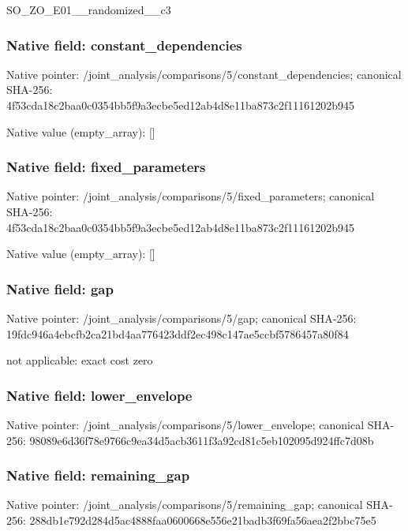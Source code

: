 \documentclass[10pt,a4paper]{article}
\begin{document}
\begingroup\raggedright\sloppy SO\_\allowbreak{}ZO\_\allowbreak{}E01\_\allowbreak{}\_\allowbreak{}randomized\_\allowbreak{}\_\allowbreak{}c3\par\endgroup

\subsubsection{Native field: constant\_\allowbreak{}dependencies}
Native pointer: /joint\_\allowbreak{}analysis/comparisons/5/constant\_\allowbreak{}dependencies; canonical SHA-256: 4f53cda18c2baa0c0354bb5f9a3ecbe5ed12ab4d8e11ba873c2f11161202b945

Native value (empty\_\allowbreak{}array): []

\subsubsection{Native field: fixed\_\allowbreak{}parameters}
Native pointer: /joint\_\allowbreak{}analysis/comparisons/5/fixed\_\allowbreak{}parameters; canonical SHA-256: 4f53cda18c2baa0c0354bb5f9a3ecbe5ed12ab4d8e11ba873c2f11161202b945

Native value (empty\_\allowbreak{}array): []

\subsubsection{Native field: gap}
Native pointer: /joint\_\allowbreak{}analysis/comparisons/5/gap; canonical SHA-256: 19fdc946a4ebcfb2ca21bd4aa776423ddf2ec498c147ae5ccbf5786457a80f84

\begingroup\raggedright\sloppy not applicable:\allowbreak{} exact cost zero\par\endgroup

\subsubsection{Native field: lower\_\allowbreak{}envelope}
Native pointer: /joint\_\allowbreak{}analysis/comparisons/5/lower\_\allowbreak{}envelope; canonical SHA-256: 98089e6d36f78e9766c9ea34d5acb3611f3a92cd81c5eb102095d924ffc7d08b

\begingroup\raggedright{}\par\endgroup

\subsubsection{Native field: remaining\_\allowbreak{}gap}
Native pointer: /joint\_\allowbreak{}analysis/comparisons/5/remaining\_\allowbreak{}gap; canonical SHA-256: 288db1e792d284d5ac4888faa0600668e556e21badb3f69fa56aea2f2bbc75e5
\end{document}
